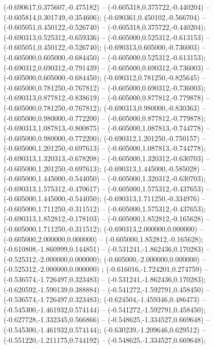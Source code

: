  (-0.690617,0.375607,-0.475182) -- (-0.605318,0.375722,-0.440204) -- (-0.605814,0.301749,-0.354606);
 (-0.690361,0.450102,-0.566704) -- (-0.605051,0.450122,-0.526740) -- (-0.605318,0.375722,-0.440204);
 (-0.690313,0.525312,-0.659336) -- (-0.605000,0.525312,-0.613153) -- (-0.605051,0.450122,-0.526740);
 (-0.690313,0.605000,-0.736003) -- (-0.605000,0.605000,-0.684450) -- (-0.605000,0.525312,-0.613153);
 (-0.690312,0.690312,-0.791439) -- (-0.605000,0.690312,-0.736003) -- (-0.605000,0.605000,-0.684450);
 (-0.690312,0.781250,-0.825645) -- (-0.605000,0.781250,-0.767812) -- (-0.605000,0.690312,-0.736003);
 (-0.690313,0.877812,-0.838619) -- (-0.605000,0.877812,-0.779878) -- (-0.605000,0.781250,-0.767812);
 (-0.690313,0.980000,-0.830363) -- (-0.605000,0.980000,-0.772200) -- (-0.605000,0.877812,-0.779878);
 (-0.690313,1.087813,-0.800875) -- (-0.605000,1.087813,-0.744778) -- (-0.605000,0.980000,-0.772200);
 (-0.690312,1.201250,-0.750157) -- (-0.605000,1.201250,-0.697613) -- (-0.605000,1.087813,-0.744778);
 (-0.690313,1.320313,-0.678208) -- (-0.605000,1.320312,-0.630703) -- (-0.605000,1.201250,-0.697613);
 (-0.690313,1.445000,-0.585028) -- (-0.605000,1.445000,-0.544050) -- (-0.605000,1.320312,-0.630703);
 (-0.690313,1.575312,-0.470617) -- (-0.605000,1.575312,-0.437653) -- (-0.605000,1.445000,-0.544050);
 (-0.690313,1.711250,-0.334976) -- (-0.605000,1.711250,-0.311512) -- (-0.605000,1.575312,-0.437653);
 (-0.690313,1.852812,-0.178103) -- (-0.605000,1.852812,-0.165628) -- (-0.605000,1.711250,-0.311512);
 (-0.690313,2.000000,0.000000) -- (-0.605000,2.000000,0.000000) -- (-0.605000,1.852812,-0.165628);
 (-0.610808,-1.860999,0.144851) -- (-0.531241,-1.862436,0.170283) -- (-0.525312,-2.000000,0.000000);
 (-0.605000,-2.000000,0.000000) -- (-0.525312,-2.000000,0.000000) ;
 (-0.616016,-1.724201,0.274759) -- (-0.536574,-1.726497,0.323483) -- (-0.531241,-1.862436,0.170283);
 (-0.620592,-1.590139,0.388884) -- (-0.541272,-1.592791,0.458450) -- (-0.536574,-1.726497,0.323483);
 (-0.624504,-1.459346,0.486473) -- (-0.545300,-1.461932,0.574144) -- (-0.541272,-1.592791,0.458450);
 (-0.627728,-1.332345,0.566866) -- (-0.548625,-1.334527,0.669648) -- (-0.545300,-1.461932,0.574144);
 (-0.630239,-1.209646,0.629512) -- (-0.551220,-1.211175,0.744192) -- (-0.548625,-1.334527,0.669648);
